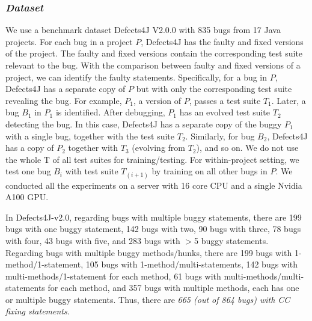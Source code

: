 \subsubsection{{\bf {\em Dataset}}}


We use a benchmark dataset Defects4J V2.0.0 \cite{defects4j} with 835
bugs from 17 Java projects. For each bug in a project $P$, Defects4J
has the faulty and fixed versions of the project. The faulty and fixed
versions contain the corresponding test suite relevant to the
bug. With the  comparison between faulty and fixed versions
of a project, we can identify the faulty statements. Specifically, for
a bug in $P$, Defects4J has a separate copy of $P$ but with only the
corresponding test suite revealing the bug. For example, $P_1$, a
version of $P$, passes a test suite $T_1$. Later, a bug $B_1$ in $P_1$
is identified. After debugging, $P_1$ has an evolved test suite $T_2$
detecting the bug. In this case, Defects4J has a separate copy of the
buggy $P_1$ with a single bug, together with the test suite
$T_2$. Similarly, for bug $B_2$, Defects4J has a copy of $P_2$
together with $T_3$ (evolving from $T_2$), and so on. We do not use
the whole T of all test suites for training/testing. For
within-project setting, we test one bug $B_i$ with test suite
$T_{(i+1)}$ by training on all other bugs in $P$. We conducted all the
experiments on a server with 16 core CPU and a single Nvidia A100 GPU.

In Defects4J-v2.0, regarding bugs with multiple buggy statements,
there are 199 bugs with one buggy statement, 142 bugs with two, 90
bugs with three, 78 bugs with four, 43 bugs with five, and 283 bugs
with $>$5 buggy statements. Regarding bugs with multiple buggy
methods/hunks, there are 199 bugs with 1-method/1-statement, 105 bugs
with 1-method/multi-statements, 142 bugs with
multi-methods/1-statement for each method, 61 bugs with
multi-methods/multi-statements for each method, and 357 bugs with
multiple methods, each has one or multiple buggy
statements. Thus, there are {\em 665 (out of 864 bugs) with CC fixing
statements}.





	
	
